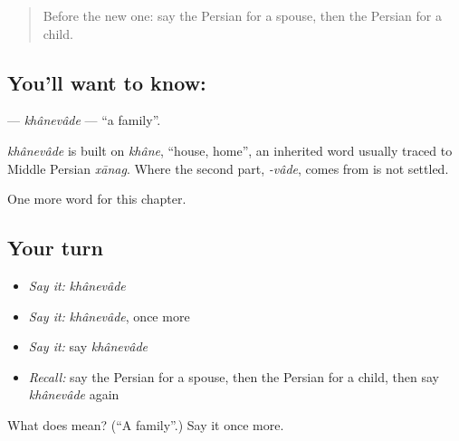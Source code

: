\label{lesson:FA-C33-khanevade}



\begin{quote}
Before the new one: say the Persian for a spouse, then the Persian for a child.
\end{quote}

\subsection*{You'll want to know: }
\textbf{} — \emph{khânevâde} — \textquotedblleft{}a family\textquotedblright{}.

\begin{cousinweb}
\emph{khânevâde} is built on \emph{khâne}, \textquotedblleft{}house, home\textquotedblright{}, an inherited word usually traced to Middle Persian \emph{xānag}. Where the second part, \emph{-vâde}, comes from is not settled.
\end{cousinweb}

\begin{grammarlens}[title={What you've built}]
One more word for this chapter.
\end{grammarlens}

\subsection*{Your turn}
\begin{itemize}
\raggedright
  \item \emph{Say it:} \emph{khânevâde}
  \item \emph{Say it:} \emph{khânevâde}, once more
  \item \emph{Say it:} say \emph{khânevâde}
  \item \emph{Recall:} say the Persian for a spouse, then the Persian for a child, then say \emph{khânevâde} again
\end{itemize}

\begin{tcolorbox}[breakable,colback=teal!4,colframe=teal!35!black,title={Before you move on}]
What does  mean? (\textquotedblleft{}A family\textquotedblright{}.) Say it once more.
\end{tcolorbox}
